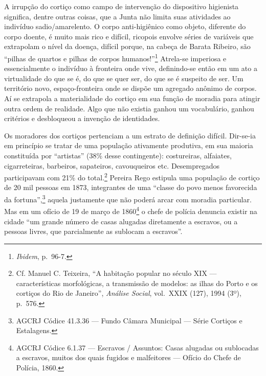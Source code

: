 A irrupção do cortiço como campo de intervenção do dispositivo
higienista significa, dentre outras coisas, que a Junta não limita suas
atividades ao indivíduo sadio/amarelento. O corpo anti-higiênico como
objeto, diferente do corpo doente, é muito mais rico e difícil, ricopois
envolve séries de variáveis que extrapolam o nível da doença, difícil
porque, na cabeça de Barata Ribeiro, são ``pilhas de quartos e pilhas de
corpos humanos!''\footnote{\textit{Ibidem}, p.~96-7.} Atrela-se imperiosa
e essencialmente o indivíduo à fronteira onde vive, definindo-se então
em um ato a virtualidade do que se é, do que se quer ser, do que se é
suspeito de ser. Um território novo, espaço-fronteira onde se dispõe um
agregado anônimo de corpos. Aí se extrapola a materialidade do cortiço
em sua função de moradia para atingir outra ordem de realidade. Algo que
não existia ganhou um vocabulário, ganhou critérios e desbloqueou a
invenção de identidades.

Os moradores dos cortiços pertenciam a um estrato de definição difícil.
Dir-se-ia em princípio se tratar de uma população ativamente produtiva,
em sua maioria constituída por ``artistas'' (38\% desse contingente):
costureiras, alfaiates, cigarreteiras, barbeiros, sapateiros,
cavouqueiros etc. Desempregados participavam com 21\% do
total.\footnote{Cf. Manuel C. Teixeira, ``A habitação popular no século
  XIX --- características morfológicas, a transmissão de modelos: as
  ilhas do Porto e os cortiços do Rio de Janeiro'', \textit{Análise
  Social}, vol.~XXIX (127), 1994 (3º), p.~576.} Pereira Rego estipula
uma população de cortiço de 20 mil pessoas em 1873, integrantes de uma
``classe do povo menos favorecida da fortuna'',\footnote{AGCRJ Códice
  41.3.36 --- Fundo Câmara Municipal --- Série Cortiços e Estalagens.}
aquela justamente que não poderá arcar com moradia particular. Mas em um
ofício de 19 de março de 1860\footnote{AGCRJ Códice 6.1.37 --- Escravos /
  Assuntos: Casas alugadas ou sublocadas a escravos, muitos dos quais
  fugidos e malfeitores --- Ofício do Chefe de Polícia, 1860.} o chefe de
polícia denuncia existir na cidade ``um grande número de casas alugadas
diretamente a escravos, ou a pessoas livres, que parcialmente as
sublocam a escravos''.

